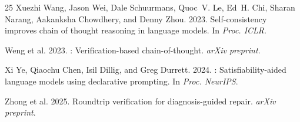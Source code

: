 \documentclass[11pt,a4paper]{article}
\begin{document}
\begin{thebibliography}{25}
Xuezhi Wang, Jason Wei, Dale Schuurmans, Quoc~V. Le, Ed~H. Chi, Sharan Narang, Aakanksha Chowdhery, and Denny Zhou. 2023.
\newblock Self-consistency improves chain of thought reasoning in language models.
\newblock In \emph{Proc. ICLR}.

Weng et al. 2023.
: Verification-based chain-of-thought.
\newblock \emph{arXiv preprint}.

Xi Ye, Qiaochu Chen, Isil Dillig, and Greg Durrett. 2024.
: Satisfiability-aided language models using declarative prompting.
\newblock In \emph{Proc. NeurIPS}.

Zhong et al. 2025.
\newblock Roundtrip verification for diagnosis-guided repair.
\newblock \emph{arXiv preprint}.

\end{thebibliography}
\end{document}

